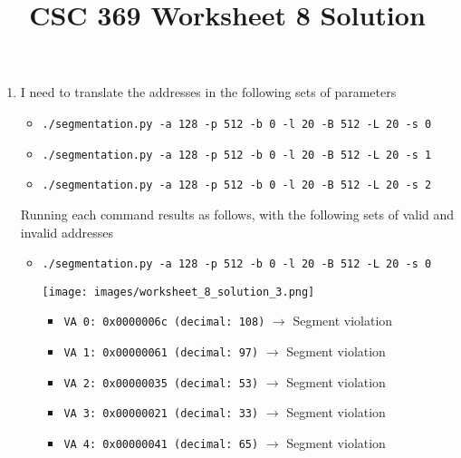 \documentclass[12pt]{article}
\begin{document}
\title{CSC 369 Worksheet 8 Solution}

\maketitle

\bigskip

\begin{enumerate}[1.]
    \item

    \bigskip

    I need to translate the addresses in the following sets of parameters

    \begin{itemize}
        \item \texttt{./segmentation.py -a 128 -p 512 -b 0 -l 20 -B 512 -L 20 -s 0}
        \item \texttt{./segmentation.py -a 128 -p 512 -b 0 -l 20 -B 512 -L 20 -s 1}
        \item \texttt{./segmentation.py -a 128 -p 512 -b 0 -l 20 -B 512 -L 20 -s 2}
    \end{itemize}

    \bigskip

    Running each command results as follows, with the following sets of valid and invalid
    addresses

    \bigskip

    \begin{itemize}
        \item \texttt{./segmentation.py -a 128 -p 512 -b 0 -l 20 -B 512 -L 20 -s 0}

        \begin{center}
        \texttt{[image: images/worksheet\_8\_solution\_3.png]}
        \end{center}

        \begin{itemize}
            \item \texttt{VA  0: 0x0000006c (decimal:  108)} $\to$ Segment violation
            \item \texttt{VA  1: 0x00000061 (decimal:   97)} $\to$ Segment violation
            \item \texttt{VA  2: 0x00000035 (decimal:   53)} $\to$ Segment violation
            \item \texttt{VA  3: 0x00000021 (decimal:   33)} $\to$ Segment violation
            \item \texttt{VA  4: 0x00000041 (decimal:   65)} $\to$ Segment violation
        \end{itemize}


\end{itemize}
\end{enumerate}
\end{document}
